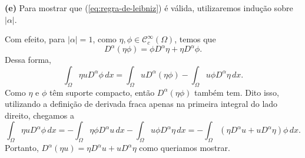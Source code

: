 \documentclass[a4paper, 11pt]{book}
\theoremstyle{definition}
\newcommand{\cC}{\mathcal{C}}
\begin{document}
\begin{prf}
    \textbf{(e)} Para mostrar que (\ref{eq:regra-de-leibniz}) é válida, utilizaremos indução sobre $|\alpha|$. 
    
    Com efeito, para $|\alpha|= 1$, como $\eta,\phi \in \cC^{\infty}_c(\Omega)$, temos que
    \[
        D^{\alpha} (\eta \phi) = \phi D^{\alpha}\eta + \eta D^{\alpha} \phi.
    \]
    Dessa forma,
    \[
        \int_\Omega \eta u D^{\alpha} \phi \, dx = \int_\Omega u D^{\alpha} (\eta \phi) - \int_\Omega u\phi D^{\alpha} \eta \, dx.
    \]
    Como $\eta$ e $\phi$ têm suporte compacto, então $D^{\alpha}(\eta \phi)$ também tem. 
    Dito isso, utilizando a definição de derivada fraca apenas na primeira integral do lado direito, chegamos a
    \[
        \int_\Omega \eta u D^{\alpha} \phi \, dx = -\int_\Omega \eta \phi D^{\alpha} u \, dx - \int_\Omega u\phi D^{\alpha} \eta \, dx = -\int_\Omega (\eta D^{\alpha}u + uD^{\alpha}\eta) \phi \,dx.
    \]
    Portanto, $D^{\alpha}(\eta u) = \eta D^{\alpha}u + uD^{\alpha}\eta$ como queriamos mostrar.


\end{prf}
\end{document}
